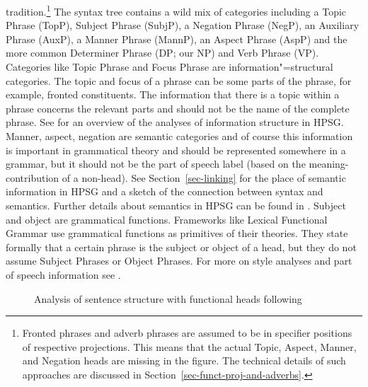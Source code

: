 tradition.\footnote{
  Fronted phrases and adverb phrases are assumed to be in specifier positions of respective
  projections. This means that the actual Topic, Aspect, Manner, and Negation heads are missing in the
  figure. The technical details of such approaches are discussed in Section~\ref{sec-funct-proj-and-adverbs}.
} The syntax tree contains a wild mix of categories including a Topic Phrase (TopP),
Subject Phrase (SubjP), a Negation Phrase (NegP), an Auxiliary Phrase (AuxP), a Manner Phrase (MannP),
an Aspect Phrase (AspP) and the more common Determiner Phrase (DP; our NP) and Verb Phrase (VP). 
%
Categories like Topic Phrase and Focus Phrase are information"=structural categories. The
topic and focus of a phrase can be some parts of the phrase, for example, fronted constituents. The
information that there is a topic within a phrase concerns the relevant parts and should not be the name of the complete phrase. See
 for an overview of the analyses of information structure in HPSG. Manner,
aspect, negation are semantic categories and of course this
information is important in grammatical theory and should be represented somewhere in a grammar, but
it should not be the part of speech label (based on the meaning-contribution of a non-head). See Section~\ref{sec-linking} for the place of semantic information in
HPSG and a sketch of the connection between syntax and semantics. Further details about semantics in
HPSG can be found in .
%
Subject
and object are grammatical functions. 
Frameworks like Lexical Functional Grammar use grammatical
functions as primitives of their theories. They state formally that a certain phrase is the subject or object
of a head, but they do not assume Subject Phrases or Object Phrases. For more on \citeauthor{CR2010a} style analyses and part of speech information see .
\begin{figure}
\caption{\label{Abbildung-Remnant-Movement-Satzstruktur}Analysis of sentence structure with functional heads following \citet[]{Laenzlinger2004a}}
\end{figure}%

